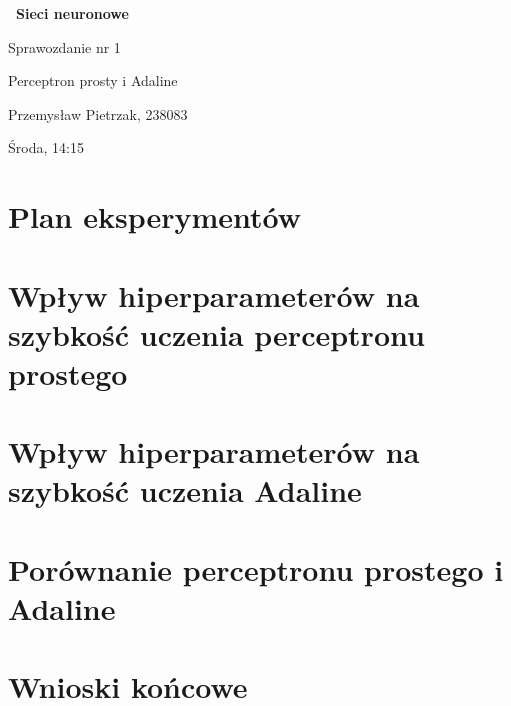 \documentclass[a4paper,10pt]{article}
\begin{document}
    
    \begin{titlepage}
     \vspace*{\fill}
    
     \vspace*{-4cm}
     \centering
     \Huge\bfseries\
     {Sieci neuronowe}
    
     \LARGE
     \centering
     \vspace{2cm}
     {Sprawozdanie nr 1}
    
     \Large
     \centering
     {Perceptron prosty i Adaline}
     
     \vspace*{0.5cm}
     
     \centering
     \large 
     \vspace{0.5cm}
     Przemysław Pietrzak, 238083
     
     Środa, 14:15
     
     \vspace*{\fill}
     \restoregeometry
    \end{titlepage}
    
    \newpage
    \tableofcontents
    
    \newpage
    \justify
    \section{Plan eksperymentów}
    
    
    \justify
    \section{Wpływ hiperparameterów na szybkość uczenia perceptronu prostego}
    
    
    \justify
    \section{Wpływ hiperparameterów na szybkość uczenia Adaline}
    
    
    \justify
    \section{Porównanie perceptronu prostego i Adaline}
    
    
    \justify
    \section{Wnioski końcowe}
    
    
\end{document}
